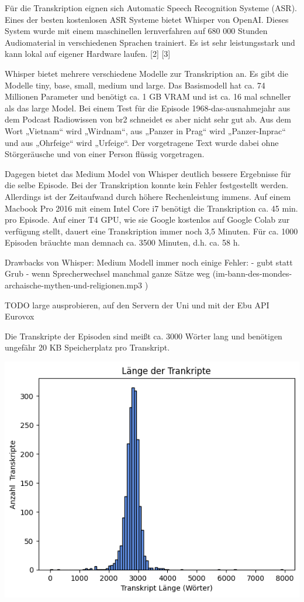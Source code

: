 Für die Transkription eignen sich Automatic Speech Recognition Systeme (ASR). 
Eines der besten kostenlosen ASR Systeme bietet Whisper von OpenAI. 
Dieses System wurde mit einem maschinellen lernverfahren auf 680 000 Stunden Audiomaterial in verschiedenen Sprachen trainiert. 
Es ist sehr leistungsstark und kann lokal auf eigener Hardware laufen. [2] [3]

Whisper bietet mehrere verschiedene Modelle zur Transkription an. Es gibt die Modelle tiny, base, small, medium und large. 
Das Basismodell hat ca. 74 Millionen Parameter und benötigt ca. 1 GB VRAM und ist ca. 16 mal schneller als das large Model. 
Bei einem Test für die Episode 1968-das-ausnahmejahr aus dem Podcast Radiowissen von br2 schneidet es aber nicht sehr gut ab. 
Aus dem Wort „Vietnam“ wird „Wirdnam“, aus „Panzer in Prag“ wird „Panzer-Inprac“ und aus  „Ohrfeige“ wird „Urfeige“. 
Der vorgetragene Text wurde dabei ohne Störgeräusche und von einer Person flüssig vorgetragen. 

Dagegen bietet das Medium Model von Whisper deutlich bessere Ergebnisse für die selbe Episode. 
Bei der Transkription konnte kein Fehler festgestellt werden. Allerdings ist der Zeitaufwand durch höhere Rechenleistung immens. 
Auf einem Macbook Pro 2016 mit einem Intel Core i7 benötigt die Transkription ca. 45 min. pro Episode. 
Auf einer T4 GPU, wie sie Google kostenlos auf Google Colab zur verfügung stellt, dauert eine Transkription immer noch 3,5 Minuten. 
Für ca. 1000 Episoden bräuchte man demnach ca. 3500 Minuten, d.h. ca. 58 h. 

Drawbacks von Whisper:
Medium Modell immer noch einige Fehler: 
- gubt statt Grub
- wenn Sprecherwechsel manchmal ganze Sätze weg (im-bann-des-mondes-archaische-mythen-und-religionen.mp3	)

TODO large ausprobieren, auf den Servern der Uni und mit der Ebu API
Eurovox


Die Transkripte der Episoden sind meißt ca. 3000 Wörter lang und benötigen ungefähr 20 KB Speicherplatz pro Transkript.

\includegraphics[width=\linewidth]{figures/transcript_length.png}


